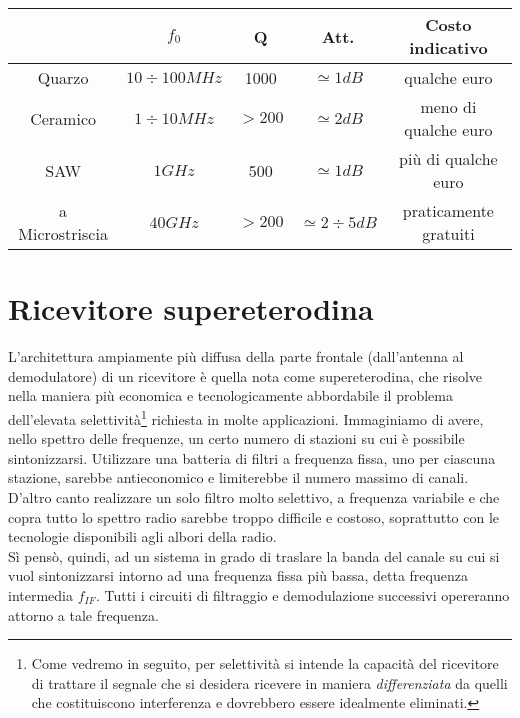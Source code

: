 \begin{center}
	\begin{tabular}{|c|c|c|c|c|}
		\hline 
		& $f_0$ & Q & Att. & Costo indicativo \\ 
		\hline 
		Quarzo & $10\div100MHz$ & 1000 & $\simeq1dB$ & qualche euro \\ 
		\hline 
		Ceramico & $1\div10MHz$ & $> 200$ & $\simeq2dB$ & meno di qualche euro \\ 
		\hline 
		SAW & $1GHz$ & 500 & $\simeq1dB$ & più di qualche euro \\ 
		\hline 
		a Microstriscia & $40GHz$ & $> 200$ & $\simeq2\div5dB$ & praticamente gratuiti \\ 
		\hline 
	\end{tabular} 
\end{center}

\section{Ricevitore supereterodina}
L'architettura ampiamente più diffusa della parte frontale (dall'antenna al demodulatore) di un ricevitore è quella nota come supereterodina, che risolve nella maniera più economica e	tecnologicamente abbordabile il problema dell'elevata selettività\footnote{Come vedremo in seguito, per selettività si intende la capacità del ricevitore di trattare il segnale che si desidera ricevere in maniera \textit{differenziata} da quelli che costituiscono interferenza e dovrebbero essere idealmente eliminati.} richiesta in molte applicazioni.
Immaginiamo di avere, nello spettro delle frequenze, un certo numero di stazioni su cui è possibile sintonizzarsi. Utilizzare una batteria di filtri a frequenza fissa, uno per ciascuna stazione, sarebbe antieconomico e limiterebbe il numero massimo di canali. D'altro canto realizzare un solo filtro molto selettivo, a frequenza variabile e che copra tutto lo spettro radio sarebbe troppo difficile e costoso, soprattutto con le tecnologie disponibili agli albori della radio.\\
Sì pensò, quindi, ad un sistema in grado di traslare la banda del canale su cui si vuol sintonizzarsi intorno ad una frequenza fissa più bassa, detta frequenza intermedia $f_{IF}$. Tutti i circuiti di filtraggio e demodulazione successivi opereranno attorno a tale frequenza.

